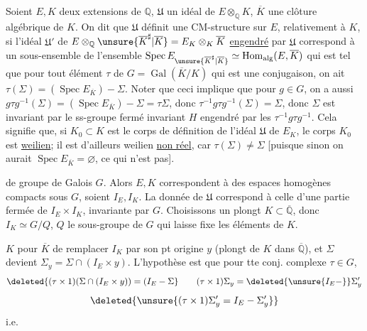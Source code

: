 Soient $E,K$ deux extensions de $\mathbb Q$, \deleted{$\unsure{\Sigma}$}
$\mathfrak U$ un idéal de  $E\otimes_{\mathbb Q}K$,
$\overline K$ une clôture algébrique de $K$.
On dit que $\mathfrak U$ définit une CM-structure sur $E$, relativement à $K$,
si l'idéal $\mathfrak U'$ de
$E\otimes_{\mathbb Q}\unsure{\overline K^{\sharp}|\overline K}=E_K\otimes_K\overline K$
\uline{engendré} par $\mathfrak U$ correspond à un sous-ensemble \inserted{$\Sigma$}
de l'ensemble  
$\operatorname{Spec}E_{\unsure{\overline K^{\sharp}|\overline K}}
\simeq\operatorname{Hom}_{\mathrm{alg}}(E,\overline K)$ qui est tel que pour tout
élément $\tau$ de $G=\operatorname{Gal}(\overline K/K)$ qui est une conjugaison,
on ait $\tau(\Sigma)=(\operatorname{Spec}E_{\overline K})-\Sigma$.
Noter que ceci implique que pour $g\in G$, on a aussi
$g\tau g^{-1}(\Sigma)=(\operatorname{Spec}E_{\overline K})-\Sigma=\tau\Sigma$,
donc $\tau^{-1}g\tau g^{-1}(\Sigma)=\Sigma$, donc $\Sigma$ est invariant
 par le ss-groupe  fermé invariant $H$
engendré par les $\tau^{-1}g\tau g^{-1}$.
Cela signifie que, si $K_0\subset K$ est le corps de définition de l'idéal
$\mathfrak U$ de $E_K$, le corps $K_0$  est \uline{weilien};
 il est d'ailleurs weilien \uline{non réel}, car $\tau(\Sigma)\ne\Sigma$
[puisque sinon on aurait $\operatorname{Spec}E_{\overline K}=\varnothing$, ce qui n'est pas].

 de groupe de Galois $G$.
Alors $E,K$ correspondent à des espaces homogènes compacts sous $G$, soient $I_E,I_K$.
La donnée de $\mathfrak U$ correspond à celle d'une partie fermée de $I_E\times I_K$,
invariante par $G$. Choisissons un plongt $K\subset\overline{\mathbb Q}$,
donc $I_K\simeq G/Q$, $Q$ le sous-groupe de $G$ qui laisse fixe les éléments de $K$.

   $K$ pour $\overline K$  de remplacer
$I_K$ par son pt origine $y$  (plongt de $K$ dans $\overline{\mathbb Q}$),
et $\Sigma$ devient $\Sigma_y=\Sigma\cap(I_E\times y)$.
L'hypothèse est que pour tte conj. complexe $\tau\in G$,
\[
\deleted{(\tau\times1)(\Sigma\cap(I_E\times y))=(I_E-\Sigma}
\qquad
(\tau\times1)\Sigma_y=\deleted{\unsure{I_E-}}\Sigma'_y
\]
\[
\deleted{\unsure{(\tau\times1)\Sigma'_y=I_E-\Sigma'_y}}
\]
i.e.
